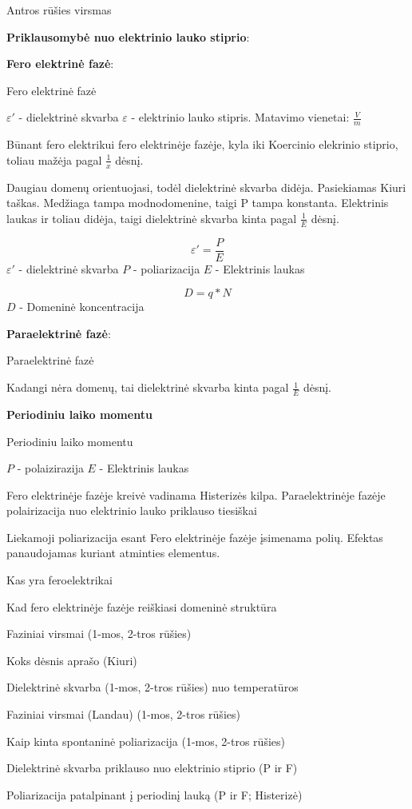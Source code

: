 {Antros rūšies virsmas}

\textbf{Priklausomybė nuo elektrinio lauko stiprio}:

\textbf{Fero elektrinė fazė}:

{Fero elektrinė fazė}

$\varepsilon'$ - dielektrinė skvarba
$\varepsilon$ - elektrinio lauko stipris. Matavimo vienetai: $\frac{V}{m}$

Būnant fero elektrikui fero elektrinėje fazėje, kyla iki Koercinio elekrinio stiprio,
toliau mažėja pagal $\frac{1}{x}$ dėsnį.

Daugiau domenų orientuojasi, todėl dielektrinė skvarba didėja.
Pasiekiamas Kiuri taškas. Medžiaga tampa modnodomenine, taigi P tampa konstanta.
Elektrinis laukas ir toliau didėja, taigi dielektrinė skvarba kinta pagal $\frac{1}{E}$
dėsnį.

\begin{equation*}
  \varepsilon' = \frac{P}{E} 
\end{equation*}
$\varepsilon'$ - dielektrinė skvarba
$P$ - poliarizacija
$E$ - Elektrinis laukas

\begin{equation*}
  D = q * N
\end{equation*}
$D$ - Domeninė koncentracija

\textbf{Paraelektrinė fazė}:

{Paraelektrinė fazė}

Kadangi nėra domenų, tai dielektrinė skvarba kinta pagal $\frac{1}{E}$
dėsnį.

\textbf{Periodiniu laiko momentu}

{Periodiniu laiko momentu}

$P$ - polaizirazija
$E$ - Elektrinis laukas

Fero elektrinėje fazėje kreivė vadinama Histerizės kilpa.
Paraelektrinėje fazėje polairizacija nuo elektrinio lauko priklauso tiesiškai

Liekamoji poliarizacija esant Fero elektrinėje fazėje įsimenama polių.
Efektas panaudojamas kuriant atminties elementus.

\begin{remember}
	\item Kas yra feroelektrikai
	\item Kad fero elektrinėje fazėje reiškiasi domeninė struktūra
	\item Faziniai virsmai (1-mos, 2-tros rūšies)
	\item Koks dėsnis aprašo (Kiuri)
	\item Dielektrinė skvarba (1-mos, 2-tros rūšies) nuo temperatūros
	\item Faziniai virsmai (Landau) (1-mos, 2-tros rūšies)
	\item Kaip kinta spontaninė poliarizacija (1-mos, 2-tros rūšies)
	\item Dielektrinė skvarba priklauso nuo elektrinio stiprio (P ir F)
	\item Poliarizacija patalpinant į periodinį lauką (P ir F; Histerizė)
\end{remember}

